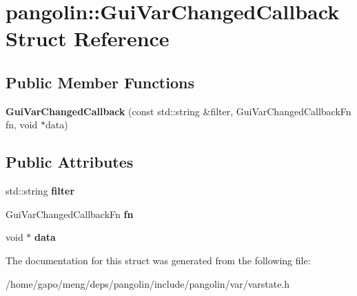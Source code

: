 \hypertarget{structpangolin_1_1_gui_var_changed_callback}{}\section{pangolin\+:\+:Gui\+Var\+Changed\+Callback Struct Reference}
\label{structpangolin_1_1_gui_var_changed_callback}
\subsection*{Public Member Functions}
\begin{DoxyCompactItemize}
\item 
{\bfseries Gui\+Var\+Changed\+Callback} (const std\+::string \&filter, Gui\+Var\+Changed\+Callback\+Fn fn, void $\ast$data)\hypertarget{structpangolin_1_1_gui_var_changed_callback_a89b6b0b49f66500586b4155510a8333b}{}\label{structpangolin_1_1_gui_var_changed_callback_a89b6b0b49f66500586b4155510a8333b}

\end{DoxyCompactItemize}
\subsection*{Public Attributes}
\begin{DoxyCompactItemize}
\item 
std\+::string {\bfseries filter}\hypertarget{structpangolin_1_1_gui_var_changed_callback_a00ab1764388fe8e7fc515639183ebaeb}{}\label{structpangolin_1_1_gui_var_changed_callback_a00ab1764388fe8e7fc515639183ebaeb}

\item 
Gui\+Var\+Changed\+Callback\+Fn {\bfseries fn}\hypertarget{structpangolin_1_1_gui_var_changed_callback_a13acd3aa5480bf5936ee169879265413}{}\label{structpangolin_1_1_gui_var_changed_callback_a13acd3aa5480bf5936ee169879265413}

\item 
void $\ast$ {\bfseries data}\hypertarget{structpangolin_1_1_gui_var_changed_callback_a124141dc977414ed43efee093f80535b}{}\label{structpangolin_1_1_gui_var_changed_callback_a124141dc977414ed43efee093f80535b}

\end{DoxyCompactItemize}


The documentation for this struct was generated from the following file\+:\begin{DoxyCompactItemize}
\item 
/home/gapo/meng/deps/pangolin/include/pangolin/var/varstate.\+h\end{DoxyCompactItemize}
